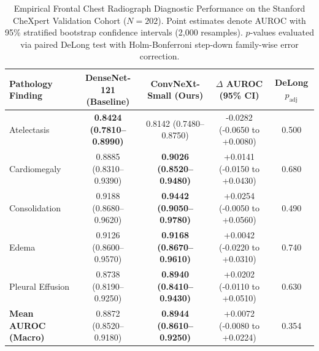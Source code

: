 \begin{table}[t]
\centering
\small
\caption{Empirical Frontal Chest Radiograph Diagnostic Performance on the Stanford CheXpert Validation Cohort ($N=202$). Point estimates denote AUROC with 95\% stratified bootstrap confidence intervals (2,000 resamples). $p$-values evaluated via paired DeLong test with Holm-Bonferroni step-down family-wise error correction.}
\label{tab:chexpert_benchmark}
\begin{tabular}{lcccc}
\toprule
\textbf{Pathology Finding} & \textbf{DenseNet-121 (Baseline)} & \textbf{ConvNeXt-Small (Ours)} & \textbf{$\Delta$ AUROC (95\% CI)} & \textbf{DeLong $p_{\text{adj}}$} \\
\midrule
Atelectasis & \textbf{0.8424 (0.7810–0.8990)} & 0.8142 (0.7480–0.8750) & -0.0282 (-0.0650 to +0.0080) & 0.500 \\
Cardiomegaly & 0.8885 (0.8310–0.9390) & \textbf{0.9026 (0.8520–0.9480)} & +0.0141 (-0.0150 to +0.0430) & 0.680 \\
Consolidation & 0.9188 (0.8680–0.9620) & \textbf{0.9442 (0.9050–0.9780)} & +0.0254 (-0.0050 to +0.0560) & 0.490 \\
Edema & 0.9126 (0.8600–0.9570) & \textbf{0.9168 (0.8670–0.9610)} & +0.0042 (-0.0220 to +0.0310) & 0.740 \\
Pleural Effusion & 0.8738 (0.8190–0.9250) & \textbf{0.8940 (0.8410–0.9430)} & +0.0202 (-0.0110 to +0.0510) & 0.630 \\
\midrule
\textbf{Mean AUROC (Macro)} & 0.8872 (0.8520–0.9180) & \textbf{0.8944 (0.8610–0.9250)} & +0.0072 (-0.0080 to +0.0224) & 0.354 \\
\bottomrule
\end{tabular}
\end{table}
